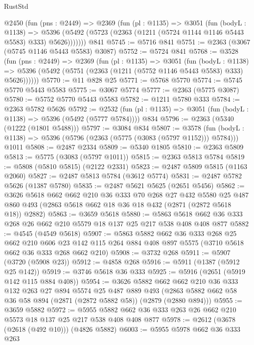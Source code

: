 \begin{lexlean}{RustStd}
\begin{coremodule}
    @2450
      (fun (pns : @2449) =>
      @2369
        (fun (pl : @1135) =>
        @3051
          (fun (bodyL : @1138) =>
          @5396 (@5492 (@5723 (@2363 (@1211 (@5724 @1144 @1146 @5443 @5583) @333) @5626)))))))
    @841
@5745 := @5716 @841
@5751 := @2363 (@3067 (@5745 @1146 @5443 @5583) @3087)
@5752 := @5724 @841
@5768 := @3528
    (fun (pns : @2449) =>
    @2369
      (fun (pl : @1135) =>
      @3051
        (fun (bodyL : @1138) =>
        @5396 (@5492 (@5751 (@2363 (@1211 (@5752 @1146 @5443 @5583) @333) @5626))))))
@5770 := @11 @828 @25
@5771 := @5768 @5770
@5774 := @5745 @5770 @5443 @5583
@5775 := @3067 @5774
@5777 := @2363 (@5775 @3087)
@5780 := @5752 @5770 @5443 @5583
@5782 := @1211 @5780 @333
@5784 := @2363 @5782 @5626
@5792 := @2532 (fun (pl : @1135) => @3051 (fun (bodyL : @1138) => @5396 (@5492 (@5777 @5784)))) @834
@5796 := @2363 (@5340 (@1222 (@1801 @5488)))
@5797 := @3084 @834
@5807 := @3578
    (fun (bodyL : @1138) => @5396 (@5796 (@2363 (@5775 (@3083 (@5797 @1152))) @5784)))
    @1011
@5808 := @2487 @2334
@5809 := @5340 @1805
@5810 := @2363 @5809
@5813 := @5775 (@3083 (@5797 @1011))
@5815 := @2363 @5813 @5784
@5819 := @5808 (@5810 @5815) (@2122 @2331)
@5823 := @2487 @5809 @5815 (@1163 @2060)
@5827 := @2487 @5813 @5784 (@3612 @5774)
@5831 := @2487 @5782 @5626 (@1387 @5780)
@5835 := @2487 @5621 @5625 (@2651 @5456)
@5862 := @3626
    @5618
    @662
    @662
    @210
    @36
    @333
    @70
    @268
    @27
    @432
    @5580
    @25
    @487
    @860
    @493
    (@2863 @5618 @662 @18 @36 @18 @432 (@2871 (@2872 @5618 @18)) @2882)
@5863 := @3659 @5618
@5880 := @5863 @5618 @662 @36 @333 @268 @26 @662 @210 @5579 @18 @137 @25 @217 @538 @408 @408 @877
@5882 := @4545 (@4549 @5618)
@5907 := @5863
    @5882
    @662
    @36
    @333
    @268
    @25
    @662
    @210
    @606
    @23
    @142
    @115
    @264
    @884
    @408
    @897
    @5575
    (@3710 @5618 @662 @36 @333 @268 @662 @210)
@5908 := @3732 @268
@5911 := @5907 (@3720 (@5908 @23))
@5912 := @4858 @268
@5916 := @5911 (@1387 (@5912 @25 @142))
@5919 := @3746 @5618 @36 @333
@5925 := @5916 (@2651 (@5919 @142 @115 @884 @408))
@5954 := @3626
    @5882
    @662
    @662
    @210
    @36
    @333
    @132
    @263
    @27
    @894
    @5574
    @25
    @487
    @889
    @493
    (@2863 @5882 @662 @58 @36 @58 @894 (@2871 (@2872 @5882 @58)) (@2879 (@2880 @894)))
@5955 := @3659 @5882
@5972 := @5955 @5882 @662 @36 @333 @263 @26 @662 @210 @5573 @18 @137 @25 @217 @538 @408 @408 @877
@5978 := @2612 (@3678 (@2618 (@492 @10))) (@4826 @5882)
@6003 := @5955
    @5978
    @662
    @36
    @333
    @263

\end{coremodule}
\end{lexlean}
